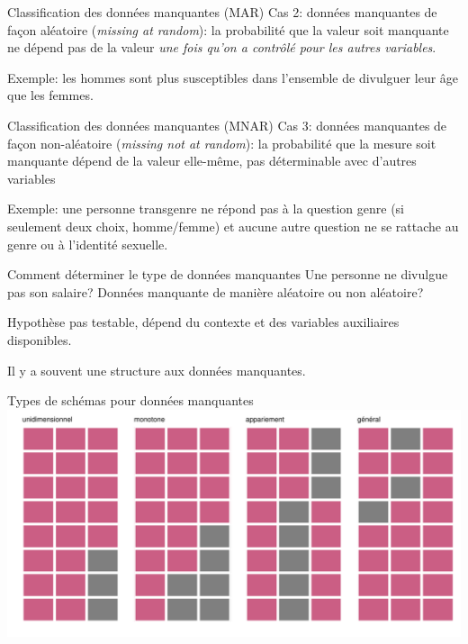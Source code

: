 \documentclass[
  ignorenonframetext,
]{beamer}
\begin{document}
\begin{frame}{Classification des données manquantes (MAR)}
\protect\hypertarget{classification-des-donnuxe9es-manquantes-mar}{}
Cas 2: données manquantes de façon aléatoire (\emph{missing at random}):
la probabilité que la valeur soit manquante ne dépend pas de la valeur
\emph{une fois qu'on a contrôlé pour les autres variables}.

Exemple: les hommes sont plus susceptibles dans l'ensemble de divulguer
leur âge que les femmes.
\end{frame}

\begin{frame}{Classification des données manquantes (MNAR)}
\protect\hypertarget{classification-des-donnuxe9es-manquantes-mnar}{}
Cas 3: données manquantes de façon non-aléatoire (\emph{missing not at
random}): la probabilité que la mesure soit manquante dépend de la
valeur elle-même, pas déterminable avec d'autres variables

Exemple: une personne transgenre ne répond pas à la question genre (si
seulement deux choix, homme/femme) et aucune autre question ne se
rattache au genre ou à l'identité sexuelle.
\end{frame}

\begin{frame}{Comment déterminer le type de données manquantes}
\protect\hypertarget{comment-duxe9terminer-le-type-de-donnuxe9es-manquantes}{}
Une personne ne divulgue pas son salaire? Données manquante de manière
aléatoire ou non aléatoire?

Hypothèse pas testable, dépend du contexte et des variables auxiliaires
disponibles.

Il y a souvent une structure aux données manquantes.
\end{frame}

\begin{frame}{Types de schémas pour données manquantes}
\protect\hypertarget{types-de-schuxe9mas-pour-donnuxe9es-manquantes}{}
\includegraphics[width=1\textwidth,height=\textheight]{MATH60602-diapos13_files/figure-beamer/unnamed-chunk-1-1.pdf}
\end{frame}
\end{document}
